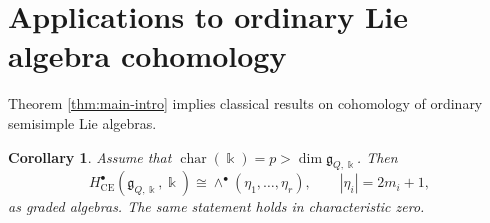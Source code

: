 \documentclass[12pt]{amsart}
\newtheorem{corollary}[theorem]{Corollary}
\theoremstyle{remark}
\newcommand{\kk}{\Bbbk}
\newcommand{\g}{\mathfrak g}
\newcommand{\CE}{\mathrm{CE}}
\begin{document}
\section{Applications to ordinary Lie algebra cohomology}
\label{sec:ordinary-cohomology}

Theorem \ref{thm:main-intro} implies classical results on cohomology of ordinary semisimple Lie algebras. 

\begin{corollary}\label{cor:ordinary-naive-bound}
Assume that $\operatorname{char}(\kk)=p>\dim\g_{Q,\kk}$.  Then
\[
 H^\bullet_{\CE}(\g_{Q,\kk},\kk)
 \cong\wedge^\bullet(\eta_1,\dots,\eta_r),
 \qquad |\eta_i|=2m_i+1,
\]
as graded algebras. The same statement holds in characteristic zero. 
\end{corollary}
\end{document}
